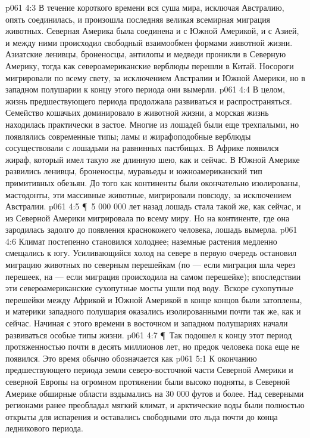 \vs p061 4:3 В течение короткого времени вся суша мира, исключая Австралию, опять соединилась, и произошла последняя великая всемирная миграция животных. Северная Америка была соединена и с Южной Америкой, и с Азией, и между ними происходил свободный взаимообмен формами животной жизни. Азиатские ленивцы, броненосцы, антилопы и медведи проникли в Северную Америку, тогда как североамериканские верблюды перешли в Китай. Носороги мигрировали по всему свету, за исключением Австралии и Южной Америки, но в западном полушарии к концу этого периода они вымерли.
\vs p061 4:4 В целом, жизнь предшествующего периода продолжала развиваться и распространяться. Семейство кошачьих доминировало в животной жизни, а морская жизнь находилась практически в застое. Многие из лошадей были еще трехпалыми, но появлялись современные типы; ламы и жирафоподобные верблюды сосуществовали с лошадьми на равнинных пастбищах. В Африке появился жираф, который имел такую же длинную шею, как и сейчас. В Южной Америке развились ленивцы, броненосцы, муравьеды и южноамериканский тип примитивных обезьян. До того как континенты были окончательно изолированы, мастодонты, эти массивные животные, мигрировали повсюду, за исключением Австралии.
\vs p061 4:5 \P\ 5 000 000 лет назад лошадь стала такой же, как сейчас, и из Северной Америки мигрировала по всему миру. Но на континенте, где она зародилась задолго до появления краснокожего человека, лошадь вымерла.
\vs p061 4:6 Климат постепенно становился холоднее; наземные растения медленно смещались к югу. Усиливающийся холод на севере в первую очередь остановил миграцию животных по северным перешейкам (по --- если миграция шла через перешеек, на --- если миграция происходила на самом перешейке); впоследствии эти североамериканские сухопутные мосты ушли под воду. Вскоре сухопутные перешейки между Африкой и Южной Америкой в конце концов были затоплены, и материки западного полушария оказались изолированными почти так же, как и сейчас. Начиная с этого времени в восточном и западном полушариях начали развиваться особые типы жизни.
\vs p061 4:7 \P\ Так подошел к концу этот период протяженностью почти в десять миллионов лет, но предок человека пока еще не появился. Это время обычно обозначается как 
\vs p061 5:1 К окончанию предшествующего периода земли северо\hyp{}восточной части Северной Америки и северной Европы на огромном протяжении были высоко подняты, в Северной Америке обширные области вздымались на 30 000 футов и более. Над северными регионами ранее преобладал мягкий климат, и арктические воды были полностью открыты для испарения и оставались свободными ото льда почти до конца ледникового периода.
